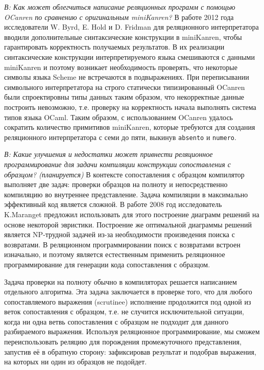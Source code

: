 \emph{В: Как может облегчиться написание реляционных программ с помощью OCanren по сравнению с оригинальным miniKanren?}
В работе 2012 года исследователи W. Byrd, E. Hold и D. Fridman для %
 реляционного интерпретатора вводили дополнительные синтаксические конструкции в miniKanren, чтобы гарантировать корректность получаемых результатов. В их реализации синтаксические конструкции интерпретируемого языка смешиваются с данными miniKanren и поэтому возникает необходимость проверять, что некоторые символы языка Scheme не встречаются в подвыражениях. При переписывании символьного интерпретатора на строго статически типизированный OCanren были спроектировны типы данных таким образом, что некорректные данные построить невозможно, т.е. проверку на корректность начала выполнять система типов языка OCaml. Таким образом, с использованием OCanren удалось сократить количество примитивов miniKanren, которые требуются для создания реляционного интерпретатора с семи до пяти, выкинув \texttt{absento} и \texttt{numero}.

\emph{В: Какие улучшения и недостатки может привнести реляционное программирование для задачи компиляции конструкции сопоставления с образцом? (планируется)}
В контексте сопоставления с образцом компилятор выполняет две задач: проверки образцов на полноту и непосредственно компиляцию во внутреннее представление. Задача компиляции в максимально эффективный код является сложной. В работе 2008 год исследователь K.Maranget предложил использовать для этого построение диаграмм решений на основе некоторой эвристики.  Построение же оптимальной диаграммы решений является NP-трудной задачей из-за необходимости произведения поиска с возвратами. В реляционном программировании поиск с возвратами встроен изначально, и поэтому является  естественным применить реляционное программирование для генерации кода сопоставления с образцом.

Задача проверки на полноту обычно в компиляторах решается написанием отдельного алгоритма. Эта задача заключается в проверке того, что для любого сопоставляемого выражения (scrutinee) исполнение продолжится под одной из веток сопоставления с образцом, т.е. не случится исключительной ситуации, когда ни одна ветвь сопоставления с образцом не подходит для данного разбираемого выражения. Используя реляционное программирование, мы сможем переиспользовать реляцию для порождения промежуточного представления, запустив её в обратную сторону: зафиксировав результат и подобрав выражения, на которых ни один из образцов не подойдет.

